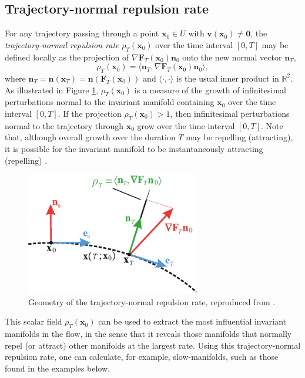 \documentclass[twocolumn]{svjour3}
\begin{document}
\subsection{Trajectory-normal repulsion rate}
For any trajectory passing through a point $\mathbf{x}_0 \in U$ with 
$\mathbf{v}(\mathbf{x}_0) \ne \mathbf{0}$, the {\it trajectory-normal repulsion rate} $\rho_T(\mathbf{x}_0)$ \cite{haller_variational_2011} over the time interval $[0, T]$ may be defined locally as the projection of $\nabla\mathbf{F}_T (\mathbf{x}_0) \mathbf{n}_0 $ onto the new normal vector
$\mathbf{n}_T$,
\begin{equation}
\rho_T(\mathbf{x}_0) = \langle  \mathbf{n}_T , \nabla \mathbf{F}_T (\mathbf{x}_0) \mathbf{n}_0 \rangle,
\label{eq:reprate}
\end{equation}
where $\mathbf{n}_T = \mathbf{n}(\mathbf{x}_T) = \mathbf{n}(\mathbf{F}_T (\mathbf{x}_0))$ and $\langle\cdot,\cdot\rangle$ is the usual inner product in $\mathbb{R}^2$. 
As illustrated in Figure \ref{fig:normal-repulsion-factor-2D}, $\rho_T(\mathbf{x}_0)$ is a measure of the growth of infinitesimal perturbations normal to the invariant manifold containing $\mathbf{x}_0$ over the time interval $[0,T]$.
If the projection $\rho_T(\mathbf{x}_0) >1$, then infinitesimal perturbations normal to the trajectory through $\mathbf{x}_0$ grow over the time interval $[0,T]$. Note that, although overall growth over the duration $T$ may be repelling (attracting), it is possible for the invariant manifold to be instantaneously attracting (repelling) \cite{tallapragada2017globally}.
\begin{figure}
\centering
\includegraphics[width=3in]{Fig1}
\caption{Geometry of the trajectory-normal repulsion rate, reproduced from \cite{nave2018global}.}
\label{fig:normal-repulsion-factor-2D}
\end{figure}

This scalar field $\rho_T(\mathbf{x}_0)$ can be used to extract the most influential invariant manifolds in the flow, in the sense that it reveals those manifolds that normally repel (or attract) other manifolds at the largest rate. Using this trajectory-normal repulsion rate, one can calculate, for example, slow-manifolds, such as those found in the examples below.
\end{document}
